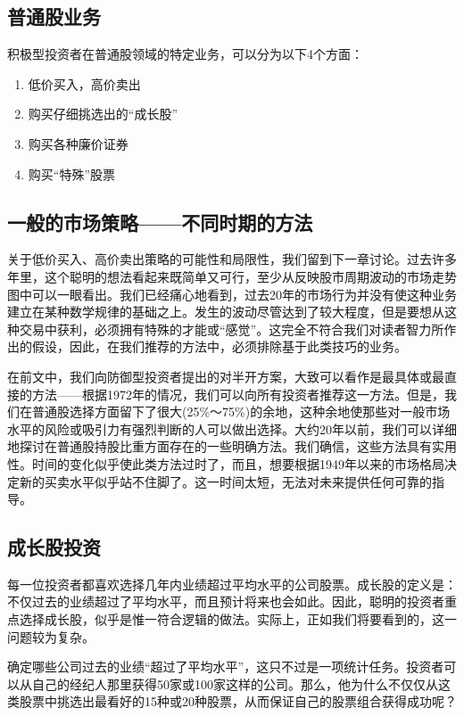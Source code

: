\documentclass[12pt,oneside]{book}
\begin{document}
\subsection{普通股业务}
积极型投资者在普通股领域的特定业务，可以分为以下4个方面：

\begin{enumerate}
\item 低价买入，高价卖出
\item 购买仔细挑选出的“成长股”
\item 购买各种廉价证券
\item 购买“特殊”股票
\end{enumerate}


\subsection{一般的市场策略——不同时期的方法}
关于低价买入、高价卖出策略的可能性和局限性，我们留到下一章讨论。过去许多年里，这个聪明的想法看起来既简单又可行，至少从反映股市周期波动的市场走势图中可以一眼看出。我们已经痛心地看到，过去20年的市场行为并没有使这种业务建立在某种数学规律的基础之上。发生的波动尽管达到了较大程度，但是要想从这种交易中获利，必须拥有特殊的才能或“感觉”。这完全不符合我们对读者智力所作出的假设，因此，在我们推荐的方法中，必须排除基于此类技巧的业务。

在前文中，我们向防御型投资者提出的对半开方案，大致可以看作是最具体或最直接的方法——根据1972年的情况，我们可以向所有投资者推荐这一方法。但是，我们在普通股选择方面留下了很大(25\%～75\%)的余地，这种余地使那些对一般市场水平的风险或吸引力有强烈判断的人可以做出选择。大约20年以前，我们可以详细地探讨在普通股持股比重方面存在的一些明确方法。我们确信，这些方法具有实用性。时间的变化似乎使此类方法过时了，而且，想要根据1949年以来的市场格局决定新的买卖水平似乎站不住脚了。这一时间太短，无法对未来提供任何可靠的指导。

\subsection{成长股投资}
每一位投资者都喜欢选择几年内业绩超过平均水平的公司股票。成长股的定义是：不仅过去的业绩超过了平均水平，而且预计将来也会如此。因此，聪明的投资者重点选择成长股，似乎是惟一符合逻辑的做法。实际上，正如我们将要看到的，这一问题较为复杂。

确定哪些公司过去的业绩“超过了平均水平”，这只不过是一项统计任务。投资者可以从自己的经纪人那里获得50家或100家这样的公司。那么，他为什么不仅仅从这类股票中挑选出最看好的15种或20种股票，从而保证自己的股票组合获得成功呢？
\end{document}
